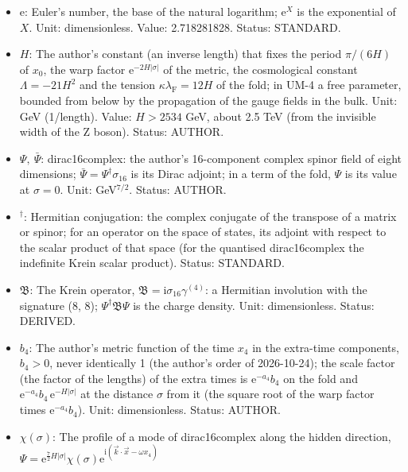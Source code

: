 \documentclass[
  10pt,
]{article}
\begin{document}
\begin{itemize}
  determinant (\(\sqrt{\lvert g\rvert}\,\mathrm{d}^8X\) is the proper
  volume element). Unit: dimensionless. Status: AUTHOR.
\item
  \(\mathrm{e}\): Euler's number, the base of the natural logarithm;
  \(\mathrm{e}^{X}\) is the exponential of \(X\). Unit: dimensionless.
  Value: 2.718281828. Status: STANDARD.
\item
  \(H\): The author's constant (an inverse length) that fixes the period
  \(\pi/(6H)\) of \(x_0\), the warp factor
  \(\mathrm{e}^{-2H\lvert\sigma\rvert}\) of the metric, the cosmological
  constant \(\Lambda = -21H^2\) and the tension
  \(\kappa\lambda_{\mathrm{F}} = 12H\) of the fold; in UM-4 a free
  parameter, bounded from below by the propagation of the gauge fields
  in the bulk. Unit: GeV (1/length). Value: \(H > 2534\) GeV, about 2.5
  TeV (from the invisible width of the Z boson). Status: AUTHOR.
\item
  \(\Psi,\ \bar\Psi\): dirac16complex: the author's 16-component complex
  spinor field of eight dimensions;
  \(\bar\Psi = \Psi^\dagger\sigma_{16}\) is its Dirac adjoint; in a term
  of the fold, \(\Psi\) is its value at \(\sigma = 0\). Unit:
  GeV\(^{7/2}\). Status: AUTHOR.
\item
  \({}^\dagger\): Hermitian conjugation: the complex conjugate of the
  transpose of a matrix or spinor; for an operator on the space of
  states, its adjoint with respect to the scalar product of that space
  (for the quantised dirac16complex the indefinite Krein scalar
  product). Status: STANDARD.
\item
  \(\mathfrak{B}\): The Krein operator,
  \(\mathfrak{B} = \mathrm{i}\sigma_{16}\gamma^{(4)}\): a Hermitian
  involution with the signature (8, 8); \(\Psi^\dagger\mathfrak{B}\Psi\)
  is the charge density. Unit: dimensionless. Status: DERIVED.
\item
  \(b_4\): The author's metric function of the time \(x_4\) in the
  extra-time components, \(b_4 > 0\), never identically 1 (the author's
  order of 2026-10-24); the scale factor (the factor of the lengths) of
  the extra times is \(\mathrm{e}^{-a_4}b_4\) on the fold and
  \(\mathrm{e}^{-a_4}b_4\,\mathrm{e}^{-H\lvert\sigma\rvert}\) at the
  distance \(\sigma\) from it (the square root of the warp factor times
  \(\mathrm{e}^{-a_4}b_4\)). Unit: dimensionless. Status: AUTHOR.
\item
  \(\chi(\sigma)\): The profile of a mode of dirac16complex along the
  hidden direction,
  \(\Psi = \mathrm{e}^{\frac72H\lvert\sigma\rvert}\chi(\sigma)\mathrm{e}^{\mathrm{i}(\vec k\cdot\vec x - \omega x_4)}\)

\end{itemize}
\end{document}
